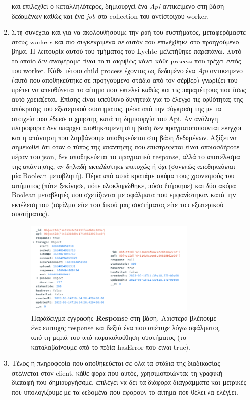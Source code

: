 \begin{enumerate}
		και επιλεχθεί ο καταλληλότερος, δημιουργεί ένα \textit{Api} αντικείμενο στη βάση δεδομένων καθώς και ένα \textit{job} στο collection του αντίστοιχου worker.
	\item Στη συνέχεια και για να ακολουθήσουμε την ροή του συστήματος, μεταφερόμαστε στους workers και πιο συγκεκριμένα σε αυτόν που επιλέχθηκε
		στο προηγούμενο βήμα. H λειτουρία αυτού του τμήματος του Lychte μελετήθηκε παραπάνω. Αυτό το οποίο δεν αναφέραμε είναι το τι ακριβώς κάνει κάθε process
		που τρέχει εντός του worker. Κάθε τέτοιο child process έχοντας ως δεδομένο ένα \textit{Api} αντικείμενο (αυτό που αποθηκεύτηκε σε προηγούμενο στάδιο από τον σέρβερ)
		γνωρίζει που πρέπει να απευθύνεται το αίτημα που εκτελεί καθώς και τις παραμέτρους που ίσως αυτό χρειάζεται. Επίσης είναι υπεύθυνο δυνητικά για το έλεγχο τις
		ορθότητας της απόκρισης του εξωτερικού συστήματος, μέσα από την σύγκριση της με τα στοιχεία που έδωσε ο χρήστης κατά τη δημιουργία του Api. Αν 
		ανάλογη πληροφορία δεν υπάρχει αποθηκευμένη στη βάση δεν πραγματοποιούνται έλεγχοι και η απάντηση που λαμβάνουμε αποθηκεύεται στη βάση δεδομένων. Αξίζει να σημειωθεί
		ότι όταν ο τύπος της απάντησης που επιστρέφεται είναι οποιοσδήποτε πέραν του json, δεν αποθηκεύεται
		το πραγματικό response, αλλά το αποτέλεσμα της απάντησης, αν δηλαδή εκτελέστηκε επιτυχώς ή όχι (συνεπώς αποθηκεύεται μία Boolean μεταβλητή).
		Πέρα από αυτά κρατάμε ακόμα τους χρονισμούς του αιτήματος (πότε ξεκίνησε, πότε ολοκληρώθηκε, πόσο διήρκησε) και δύο ακόμα Boolean μεταβλητές που σχετίζονται με σφάλματα που εμφανίστηκαν
		κατά την εκτέλεση του (σφάλμα είτε του δικού μας συστήματος είτε του εξωτερικού συστήματος).  
		\begin{figure}[!ht]
			\centering
			\includegraphics[width=0.8\textwidth]{./images/chapter4/response_docs.png}
			\caption[Παράδειγμα εγγραφών \textbf{Response} στη βάση]{Παράδειγμα εγγραφής \textbf{Response} στη βάση. Αριστερά βλέπουμε ένα επιτυχές response και δεξιά ένα που απέτυχε λόγω σφάλματος από τη μεριά του υπό παρακολούθηση συστήματος (το καταλαβαίνουμε από το πεδία hasError που είναι true).}
			\label{fig:response_docs}
		\end{figure}
	\item Τέλος η πληροφορία που αποθηκεύεται σε όλα τα στάδια της διαδικασίας στέλνεται στον client, κάθε φορά που αυτός, χρησιμοποιώντας τη γραφική διεπαφή
		που δημιουργήσαμε, επιλέγει να δει τα διάφορα διαγράμματα και μετρικές που υπολογίζουμε με τα δεδομένα που αφορούν το αίτημα που θέλει να ελέγξει.
\end{enumerate}

